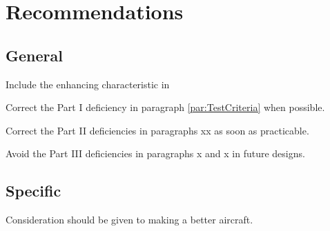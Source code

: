 \chapter{Recommendations}\label{ch:Recommend}

\section{General}\label{sec:RecGeneral}
\p Include the enhancing characteristic in \pp

\p Correct the Part I deficiency in paragraph \ref{par:TestCriteria} when possible. \pp

\p Correct the Part II deficiencies in paragraphs xx as soon as practicable. \pp

\p Avoid the Part III deficiencies in paragraphs x and x in future designs. \pp

\section{Specific}\label{sec:RecSpecific}
\p Consideration should be given to making a better aircraft. \pp